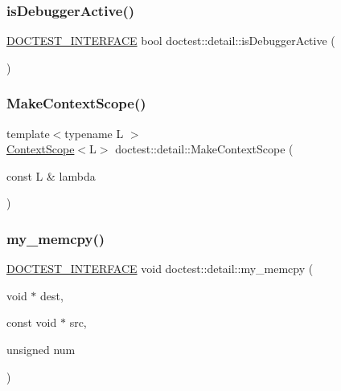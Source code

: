 \mbox{\label{namespacedoctest_1_1detail_a013828c4e677241cc26aeea33f762710}} 
\subsubsection{\texorpdfstring{is\+Debugger\+Active()}{isDebuggerActive()}}
{\footnotesize\ttfamily \hyperlink{doctest_8h_a9c16ffc635ec47f07797d21ede26b1a5}{D\+O\+C\+T\+E\+S\+T\+\_\+\+I\+N\+T\+E\+R\+F\+A\+CE} bool doctest\+::detail\+::is\+Debugger\+Active (\begin{DoxyParamCaption}{ }\end{DoxyParamCaption})}

\mbox{\label{namespacedoctest_1_1detail_a193493f40330f096b9e1b78557a832a3}} 
\subsubsection{\texorpdfstring{Make\+Context\+Scope()}{MakeContextScope()}}
{\footnotesize\ttfamily template$<$typename L $>$ \\
\hyperlink{classdoctest_1_1detail_1_1_context_scope}{Context\+Scope}$<$L$>$ doctest\+::detail\+::\+Make\+Context\+Scope (\begin{DoxyParamCaption}\item[{const L \&}]{lambda }\end{DoxyParamCaption})}

\mbox{\label{namespacedoctest_1_1detail_a4027cb5407ce2ff132645e89bba97010}} 
\subsubsection{\texorpdfstring{my\+\_\+memcpy()}{my\_memcpy()}}
{\footnotesize\ttfamily \hyperlink{doctest_8h_a9c16ffc635ec47f07797d21ede26b1a5}{D\+O\+C\+T\+E\+S\+T\+\_\+\+I\+N\+T\+E\+R\+F\+A\+CE} void doctest\+::detail\+::my\+\_\+memcpy (\begin{DoxyParamCaption}\item[{void $\ast$}]{dest,  }\item[{const void $\ast$}]{src,  }\item[{unsigned}]{num }\end{DoxyParamCaption})}

